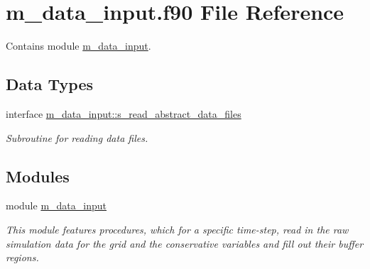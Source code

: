 \hypertarget{m__data__input_8f90}{}\section{m\+\_\+data\+\_\+input.\+f90 File Reference}
\label{m__data__input_8f90}


Contains module \hyperlink{namespacem__data__input}{m\+\_\+data\+\_\+input}.  


\subsection*{Data Types}
\begin{DoxyCompactItemize}
\item 
interface \hyperlink{interfacem__data__input_1_1s__read__abstract__data__files}{m\+\_\+data\+\_\+input\+::s\+\_\+read\+\_\+abstract\+\_\+data\+\_\+files}
\begin{DoxyCompactList}\small\item\em Subroutine for reading data files. \end{DoxyCompactList}\end{DoxyCompactItemize}
\subsection*{Modules}
\begin{DoxyCompactItemize}
\item 
module \hyperlink{namespacem__data__input}{m\+\_\+data\+\_\+input}
\begin{DoxyCompactList}\small\item\em This module features procedures, which for a specific time-\/step, read in the raw simulation data for the grid and the conservative variables and fill out their buffer regions. \end{DoxyCompactList}\end{DoxyCompactItemize}
